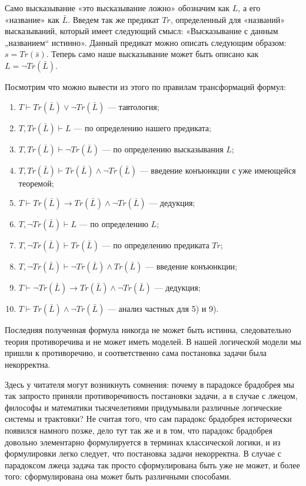 Само высказывание «это высказывание ложно» обозначим как $L$, а его «название» как $\bar{L}$. Введем так же предикат $Tr$, определенный для «названий» высказываний, который имеет следующий смысл: «Высказывание с данным „названием“ истинно». Данный предикат можно описать следующим образом: $s = Tr(\bar{s})$. Теперь само наше высказывание может быть описано как $L = \neg Tr(\bar{L})$.

Посмотрим что можно вывести из этого по правилам трансформаций формул:

\begin{enumerate}
\item  $T\vdash Tr(\bar{L})\vee\neg Tr(\bar{L})$ — тавтология;
\item  $T, Tr(\bar{L})\vdash L$ — по определению нашего предиката;
\item  $T, Tr(\bar{L})\vdash \neg Tr(\bar{L})$ — по определению высказывания $L$;
\item  $T, Tr(\bar{L})\vdash Tr(\bar{L})\wedge\neg Tr(\bar{L})$ — введение конъюнкции с уже имеющейся теоремой;
\item  $T\vdash Tr(\bar{L})\rightarrow Tr(\bar{L})\wedge\neg Tr(\bar{L})$ — дедукция;
\item  $T, \neg Tr(\bar{L})\vdash L$ — по определению $L$;
\item  $T, \neg Tr(\bar{L}) \vdash Tr(\bar{L})$ — по определению предиката $Tr$;
\item  $T, \neg Tr(\bar{L})\vdash \neg Tr(\bar{L}) \wedge Tr(\bar{L})$ — введение конъюнкции;
\item  $T\vdash \neg Tr(\bar{L})\rightarrow Tr(\bar{L})\wedge\neg Tr(\bar{L})$ — дедукция;
\item  $T\vdash Tr(\bar{L})\wedge\neg Tr(\bar{L})$ — анализ частных для 5) и 9).
\end{enumerate}

Последняя полученная формула никогда не может быть истинна, следовательно теория противоречива и не может иметь моделей. В нашей логической модели мы пришли к противоречию, и соответственно сама постановка задачи была некорректна.

Здесь у читателя могут возникнуть сомнения: почему в парадоксе брадобрея мы так запросто приняли противоречивость постановки задачи, а в случае с лжецом, философы и математики тысячелетиями придумывали различные логические системы и трактовки? Не считая того, что сам парадокс брадобрея исторически появился намного позже, дело тут так же и в том, что парадокс брадобрея довольно элементарно формулируется в терминах классической логики, и из формулировки легко следует, что постановка задачи некорректна. В случае с парадоксом лжеца задача так просто сформулирована быть уже не может, и более того: сформулирована она может быть различными способами.

